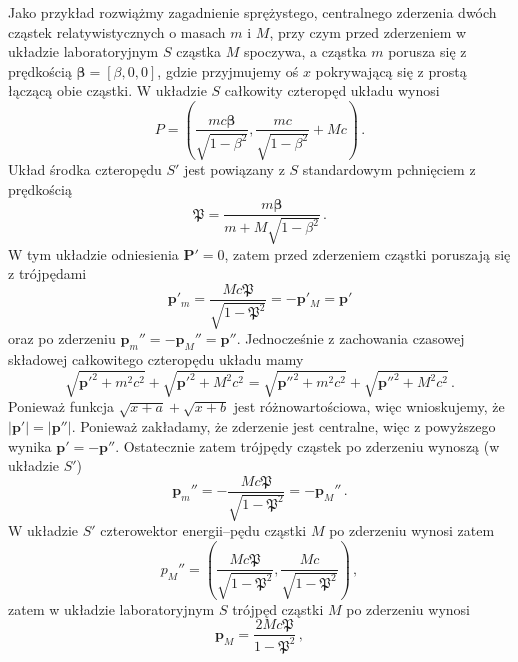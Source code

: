 \documentclass[../main.tex]{subfiles}
\begin{document}
Jako przykład rozwiążmy zagadnienie sprężystego, centralnego zderzenia dwóch cząstek
relatywistycznych o masach \(m\) i \(M\), przy czym przed zderzeniem w układzie laboratoryjnym \(S\)
cząstka \(M\) spoczywa, a cząstka \(m\) porusza się z prędkością \(\boldsymbol{\beta}=[\beta,0,0]\),
gdzie przyjmujemy oś \(x\) pokrywającą się z prostą łączącą obie cząstki. W układzie \(S\) całkowity
czteropęd układu wynosi
\begin{equation*}
    P=\left(\frac{mc\boldsymbol{\beta}}{\sqrt{1-\beta^2}},\frac{mc}{\sqrt{1-\beta^2}}+Mc\right)\,.
\end{equation*}
Układ środka czteropędu \(S'\) jest powiązany z \(S\) standardowym pchnięciem z prędkością
\begin{equation*}
    \boldsymbol{\mathfrak{P}}=\frac{m\boldsymbol{\beta}}{m+M\sqrt{1-\beta^2}}\,.
\end{equation*}
W tym układzie odniesienia \(\mathbf{P}'=0\), zatem przed zderzeniem cząstki poruszają się z
trójpędami
\begin{equation*}
    \mathbf{p}'_m=\frac{Mc\boldsymbol{\mathfrak{P}}}{\sqrt{1-\mathfrak{P}^2}}=-\mathbf{p}'_M=\mathbf{p}'
\end{equation*}
oraz po zderzeniu \(\mathbf{p}_m''=-\mathbf{p}_M''=\mathbf{p}''\). Jednocześnie z zachowania
czasowej składowej całkowitego czteropędu układu mamy
\begin{equation*}
    \sqrt{\mathbf{p}'^2+m^2c^2}+\sqrt{\mathbf{p}'^2+M^2c^2}=\sqrt{\mathbf{p}''^2+m^2c^2}+\sqrt{\mathbf{p}''^2+M^2c^2}\,.
\end{equation*}
Ponieważ funkcja \(\sqrt{x+a}+\sqrt{x+b}\) jest różnowartościowa, więc wnioskujemy, że
\(|\mathbf{p}'|=|\mathbf{p}''|\). Ponieważ zakładamy, że zderzenie jest centralne, więc z powyższego
wynika \(\mathbf{p}'=-\mathbf{p}''\). Ostatecznie zatem trójpędy cząstek po zderzeniu wynoszą (w
układzie \(S'\))
\begin{equation*}
    \mathbf{p}_m''=-\frac{Mc\boldsymbol{\mathfrak{P}}}{\sqrt{1-\mathfrak{P}^2}}=-\mathbf{p}_M''\,.
\end{equation*}
W układzie \(S'\) czterowektor energii--pędu cząstki \(M\) po zderzeniu wynosi zatem
\begin{equation*}
    p_M''=\left(\frac{Mc\boldsymbol{\mathfrak{P}}}{\sqrt{1-\mathfrak{P}^2}},\frac{Mc}{\sqrt{1-\mathfrak{P}^2}}\right)\,,
\end{equation*}
zatem w układzie laboratoryjnym \(S\) trójpęd cząstki \(M\) po zderzeniu wynosi
\begin{equation*}
    \mathbf{p}_M=\frac{2Mc\boldsymbol{\mathfrak{P}}}{1-\mathfrak{P}^2}\,,
\end{equation*}
\end{document}
